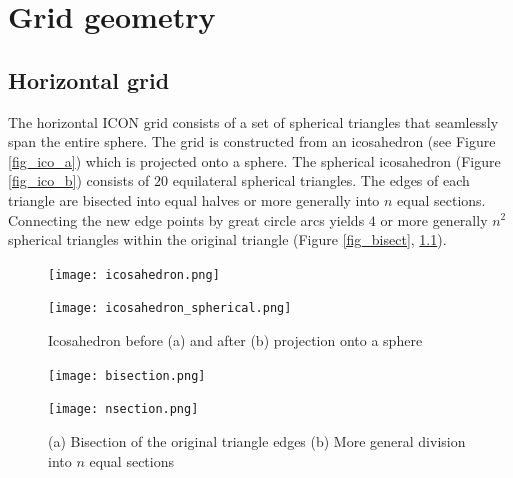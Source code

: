 
\chapter{Grid geometry}


\section{Horizontal grid}

The horizontal ICON grid consists of a set of spherical triangles that seamlessly span the entire sphere. The grid is constructed from an icosahedron (see Figure 
\ref{fig_ico_a}) which is projected onto a sphere. The spherical icosahedron (Figure \ref{fig_ico_b}) consists of $20$ equilateral spherical triangles. The edges of each triangle 
are bisected into equal halves or more generally into $n$ equal sections. Connecting the new edge points by great circle arcs yields $4$ or more generally $n^2$ spherical triangles 
within the original triangle (Figure \ref{fig_bisect}, \ref{fig_nsect}). 

\begin{figure}[h]
  \begin{minipage}[b]{0.4\textwidth}
    \centering
    \texttt{[image: icosahedron.png]}
    \subcaption{}\label{fig_ico_a}
  \end{minipage}\hfill
  \begin{minipage}[b]{0.4\textwidth}
    \centering
    \texttt{[image: icosahedron\_spherical.png]}
    \subcaption{}\label{fig_ico_b}
  \end{minipage}\hfill
  \caption{Icosahedron before (a) and after (b) projection onto a sphere }

\hfill

  \begin{minipage}[b]{0.4\textwidth}
    \centering
    \texttt{[image: bisection.png]}
    \subcaption{}\label{fig_bisect}
  \end{minipage}\hfill
  \begin{minipage}[b]{0.4\textwidth}
    \centering
    \texttt{[image: nsection.png]}
    \subcaption{}\label{fig_nsect}
  \end{minipage}\hfill
  \caption{(a) Bisection of the original triangle edges (b) More general division into $n$ equal sections}
\end{figure}

